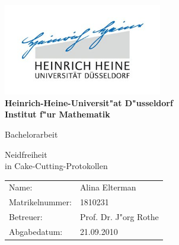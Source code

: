 \documentclass[11pt, a4paper, twoside]{article}
\numberwithin{equation}{section}
\begin{document}
\begin{titlepage}
\begin{center}
\includegraphics[height=4cm]{hhulogo.jpg}\\
\vspace{1em}
\textbf{
\Large Heinrich-Heine-Universit"at D"usseldorf\\
\smallskip
\Large Institut f"ur Mathematik\\
\smallskip}

\vspace{3em}
{\Huge Bachelorarbeit}

\vspace{4em} {\Huge Neidfreiheit \\ \vspace{1em} in Cake-Cutting-Protokollen}
\end{center}

\vfill

\begin{center}
{\large
\begin{tabular}[l]{ll}
Name: & Alina Elterman\\
Matrikelnummer: & 1810231\\
Betreuer: & Prof. Dr. J"org Rothe\\
Abgabedatum: & 21.09.2010
\end{tabular}
}
\end{center}
\end{titlepage}
\newpage
\thispagestyle{empty}
\tableofcontents
\newpage
\thispagestyle{empty}
\printnomenclature
\newpage
\thispagestyle{empty}
\listoffigures
\newpage
{}
\setcounter{page}{1}
\end{document}
